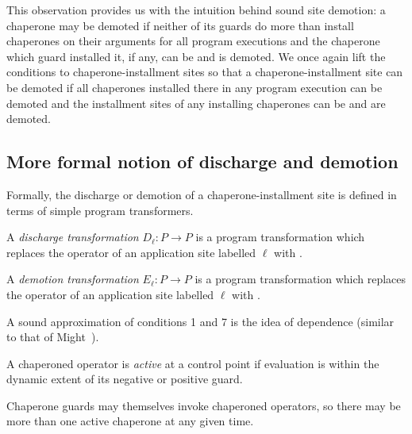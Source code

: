 This observation provides us with the intuition behind sound site demotion: a chaperone may be demoted if neither of its guards do more than install chaperones on their arguments for all program executions and the chaperone which guard installed it, if any, can be and is demoted. 
We once again lift the conditions to chaperone-installment sites so that a chaperone-installment site can be demoted if all chaperones installed there in any program execution can be demoted and the installment sites of any installing chaperones can be and are demoted.



\subsection{More formal notion of discharge and demotion}

Formally, the discharge or demotion of a chaperone-installment site is defined in terms of simple program transformers.

\begin{definition}
A \emph{discharge transformation} $D_\ell : P\rightarrow P$ is a program transformation which replaces the operator of an application site labelled $\ell$ with .
\end{definition}

\begin{definition}
A \emph{demotion transformation} $E_\ell : P\rightarrow P$ is a program transformation which replaces the operator of an application site labelled $\ell$ with .
\end{definition}

A sound approximation of conditions 1 and 7 is the idea of dependence (similar to that of Might~\cite{might2009interprocedural}).

\begin{definition}
A chaperoned operator is \emph{active} at a control point if evaluation is within the dynamic extent of its negative or positive guard.
\end{definition}

Chaperone guards may themselves invoke chaperoned operators, so there may be more than one active chaperone at any given time.

